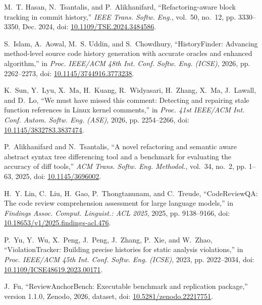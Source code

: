 M.~T. Hasan, N.~Tsantalis, and P.~Alikhanifard, ``Refactoring-aware block tracking in commit history,'' \emph{IEEE Trans. Softw. Eng.}, vol.~50, no.~12, pp. 3330--3350, Dec. 2024, doi: \href{https://doi.org/10.1109/TSE.2024.3484586}{10.1109/TSE.2024.3484586}.

S.~Islam, A.~Aowal, M.~S. Uddin, and S.~Chowdhury, ``HistoryFinder: Advancing method-level source code history generation with accurate oracles and enhanced algorithm,'' in \emph{Proc. IEEE/ACM 48th Int. Conf. Softw. Eng. (ICSE)}, 2026, pp. 2262--2273, doi: \href{https://doi.org/10.1145/3744916.3773238}{10.1145/3744916.3773238}.

K.~Sun, Y.~Lyu, X.~Ma, H.~Kuang, R.~Widyasari, H.~Zhang, X.~Ma, J.~Lawall, and D.~Lo, ``We must have missed this comment: Detecting and repairing stale function references in Linux kernel comments,'' in \emph{Proc. 41st IEEE/ACM Int. Conf. Autom. Softw. Eng. (ASE)}, 2026, pp. 2254--2266, doi: \href{https://doi.org/10.1145/3832783.3837474}{10.1145/3832783.3837474}.

P.~Alikhanifard and N.~Tsantalis, ``A novel refactoring and semantic aware abstract syntax tree differencing tool and a benchmark for evaluating the accuracy of diff tools,'' \emph{ACM Trans. Softw. Eng. Methodol.}, vol.~34, no.~2, pp. 1--63, 2025, doi: \href{https://doi.org/10.1145/3696002}{10.1145/3696002}.

H.~Y. Lin, C.~Liu, H.~Gao, P.~Thongtanunam, and C.~Treude, ``CodeReviewQA: The code review comprehension assessment for large language models,'' in \emph{Findings Assoc. Comput. Linguist.: ACL 2025}, 2025, pp. 9138--9166, doi: \href{https://doi.org/10.18653/v1/2025.findings-acl.476}{10.18653/v1/2025.findings-acl.476}.

P.~Yu, Y.~Wu, X.~Peng, J.~Peng, J.~Zhang, P.~Xie, and W.~Zhao, ``ViolationTracker: Building precise histories for static analysis violations,'' in \emph{Proc. IEEE/ACM 45th Int. Conf. Softw. Eng. (ICSE)}, 2023, pp. 2022--2034, doi: \href{https://doi.org/10.1109/ICSE48619.2023.00171}{10.1109/ICSE48619.2023.00171}.

J.~Fu, ``ReviewAnchorBench: Executable benchmark and replication package,'' version 1.1.0, Zenodo, 2026, dataset, doi: \href{https://doi.org/10.5281/zenodo.22217751}{10.5281/zenodo.22217751}.
